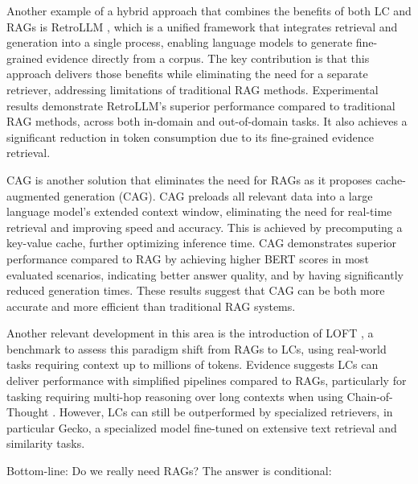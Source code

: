 Another example of a hybrid approach that combines the benefits of both LC and RAGs is RetroLLM , which is a unified framework that integrates retrieval and generation into a single process, enabling language models to generate fine-grained evidence directly from a corpus. The key contribution is that this approach delivers those benefits while eliminating the need for a separate retriever, addressing limitations of traditional RAG methods. Experimental results demonstrate RetroLLM's superior performance compared to traditional RAG methods, across both in-domain and out-of-domain tasks. It also achieves a significant reduction in token consumption due to its fine-grained evidence retrieval.

CAG  is another solution that eliminates the need for RAGs as it proposes cache-augmented generation (CAG). CAG preloads all relevant data into a large language model's extended context window, eliminating the need for real-time retrieval and improving speed and accuracy. This is achieved by precomputing a key-value cache, further optimizing inference time. CAG demonstrates superior performance compared to RAG by achieving higher BERT scores in most evaluated scenarios, indicating better answer quality, and by having significantly reduced generation times. These results suggest that CAG can be both more accurate and more efficient than traditional RAG systems.

Another relevant development in this area is the introduction of LOFT , a benchmark to assess this paradigm shift from RAGs to LCs, using real-world tasks requiring context up to millions of tokens. Evidence suggests LCs can deliver performance with simplified pipelines compared to RAGs, particularly for tasking requiring multi-hop reasoning over long contexts when using Chain-of-Thought . However, LCs can still be outperformed by specialized retrievers, in particular Gecko, a specialized model fine-tuned on extensive text retrieval and similarity tasks.

Bottom-line: Do we really need RAGs? The answer is conditional:


